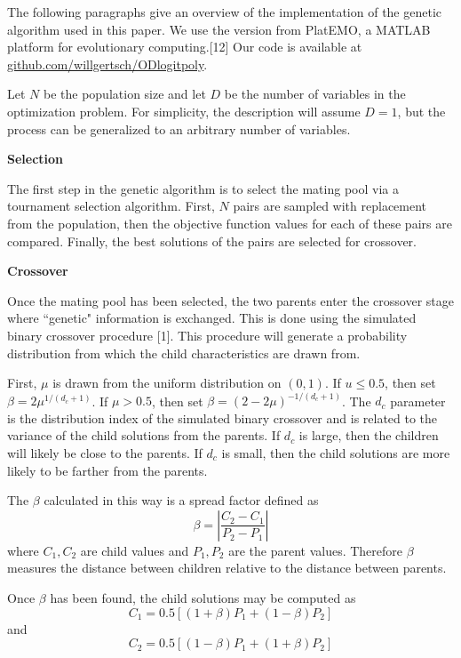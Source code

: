 \documentclass[11pt,a4paper]{article}
\begin{document}
The following paragraphs give an overview of  the implementation of the genetic algorithm used in this paper. We use the version from PlatEMO, a MATLAB platform for evolutionary computing.[12] Our code is available at \href{https://github.com/willgertsch/ODlogitpoly}{github.com/willgertsch/ODlogitpoly}.

Let $N$ be the population size and let $D$ be the number of variables in the optimization problem. For simplicity, the description will assume $D=1$, but the process can be generalized to an arbitrary number of variables.

\begin{flushleft}
\textbf{Selection}
\end{flushleft}
The first step in the genetic algorithm is to select the mating pool via a tournament selection algorithm. First, $N$ pairs are sampled with replacement from the population, then the objective function values for each of these pairs are compared. Finally, the best solutions of the pairs are selected for crossover.

\begin{flushleft}
\textbf{Crossover}
\end{flushleft}
Once the mating pool has been selected, the two parents enter the crossover stage where ``genetic" information is exchanged. This is done using the simulated binary crossover procedure [1]. This procedure will generate a probability distribution from which the child characteristics are drawn from.

First, $\mu$ is drawn from the uniform distribution on $(0,1)$. If $u \leq 0.5$, then set $\beta = 2\mu^{1/(d_c+1)}$. If $\mu > 0.5$, then set $\beta = (2-2\mu)^{-1/(d_c+1)}$. The $d_c$ parameter is the distribution index of the simulated binary crossover and is related to the variance of the child solutions from the parents. If $d_c$ is large, then the children will likely be close to the parents.  If $d_c$ is small, then the child solutions are more likely to be farther from the parents.

The $\beta$ calculated in this way is a spread factor defined as 
$$
\beta = \left| \frac{C_2 - C_1}{P_2 - P_1} \right|
$$
where $C_1, C_2$ are child values and $P_1, P_2$ are the parent values. Therefore $\beta$ measures the distance between children relative to the distance between parents.

Once $\beta$ has been found, the child solutions may be computed as
$$
C_1 = 0.5\left[(1+\beta)P_1 + (1-\beta)P_2 \right]
$$
and 
$$
C_2 = 0.5\left[(1-\beta)P_1 + (1+\beta)P_2 \right]
$$
\end{document}
